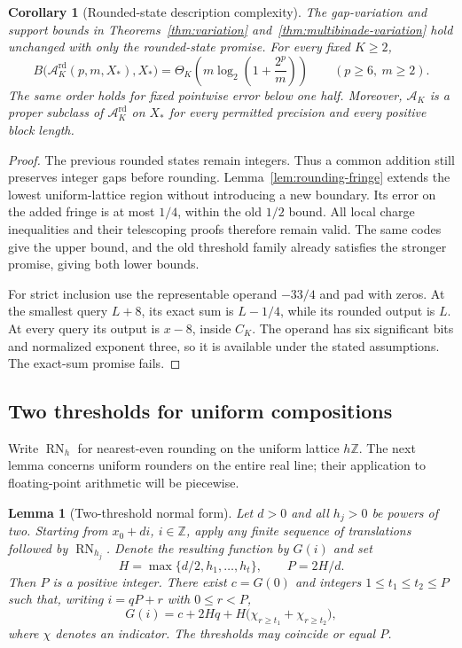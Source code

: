 \documentclass[11pt,reqno]{amsart}
\newtheorem{lemma}[theorem]{Lemma}
\newtheorem{corollary}[theorem]{Corollary}
\theoremstyle{definition}
\theoremstyle{remark}
\numberwithin{equation}{section}
\DeclareMathOperator{\RN}{RN}
\begin{document}
\begin{corollary}[Rounded-state description complexity]
\label{cor:rounded-corridor}
The gap-variation and support bounds in
Theorems~\ref{thm:variation} and~\ref{thm:multibinade-variation} hold
unchanged with only the rounded-state promise. For every fixed $K\geq2$,
\[
 B\bigl(\mathcal A_K^{\mathrm{rd}}(p,m,X_\ast),X_\ast\bigr)
 =\Theta_K\!\left(m\log_2\left(1+\frac{2^p}{m}\right)\right)
 \qquad(p\geq6,\ m\geq2).
\]
The same order holds for fixed pointwise error below one half. Moreover,
$\mathcal A_K$ is a proper subclass of $\mathcal A_K^{\mathrm{rd}}$ on
$X_\ast$ for every permitted precision and every positive block length.
\end{corollary}

\begin{proof}
The previous rounded states remain integers. Thus a common addition still
preserves integer gaps before rounding. Lemma~\ref{lem:rounding-fringe}
extends the lowest uniform-lattice region without introducing a new
boundary. Its error on the added fringe is at most $1/4$, within the old
$1/2$ bound. All local charge inequalities and their telescoping proofs
therefore remain valid. The same codes give the upper bound, and the old
threshold family already satisfies the stronger promise, giving both
lower bounds.

For strict inclusion use the representable operand $-33/4$ and pad with
zeros. At the smallest query $L+8$, its exact sum is $L-1/4$, while its
rounded output is $L$. At every query its output is $x-8$, inside $C_K$.
The operand has six significant bits and normalized exponent three, so
it is available under the stated assumptions. The exact-sum promise fails.
\end{proof}

\subsection{Two thresholds for uniform compositions}

Write $\RN_h$ for nearest-even rounding on the uniform lattice $h\mathbb Z$.
The next lemma concerns uniform rounders on the entire real line;
their application to floating-point arithmetic will be piecewise.

\begin{samepage}
\begin{lemma}[Two-threshold normal form]\label{lem:two-threshold}
Let $d>0$ and all $h_j>0$ be powers of two. Starting from $x_0+di$,
$i\in\mathbb Z$, apply any finite sequence of translations followed by
$\RN_{h_j}$. Denote the resulting function by $G(i)$ and set
\[
 H=\max\{d/2,h_1,\ldots,h_t\},\qquad P=2H/d.
\]
Then $P$ is a positive integer. There exist $c=G(0)$ and integers
$1\leq t_1\leq t_2\leq P$ such that, writing $i=qP+r$ with $0\leq r<P$,
\begin{equation}\label{eq:two-threshold}
 G(i)=c+2Hq+H\bigl(\chi_{r\geq t_1}+\chi_{r\geq t_2}\bigr),
\end{equation}
where $\chi$ denotes an indicator. The thresholds may coincide or equal $P$.
\end{lemma}
\end{samepage}
\end{document}
